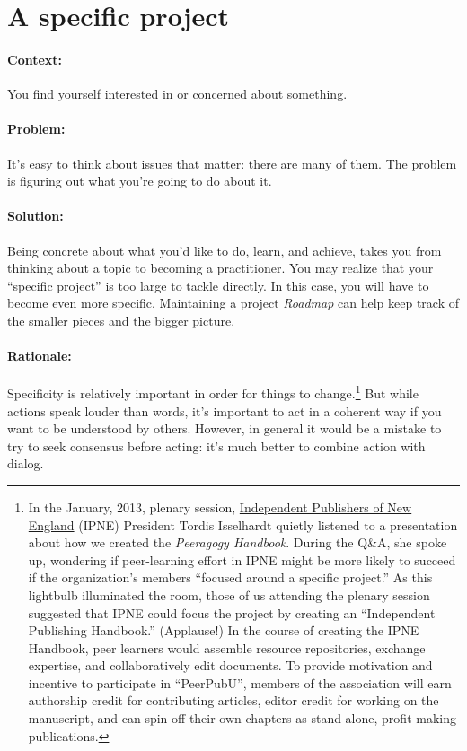 \section{A specific project}
\paragraph{Context:}
You find yourself interested in or concerned about something.

\paragraph{Problem:}
It's easy to think about issues that matter: there are many of them. The problem is figuring out what you're going to do about it.

\paragraph{Solution:} 
Being concrete about what you'd like to do, learn, and achieve, takes you from thinking about a topic to becoming a practitioner.  You may realize that your ``specific project'' is too large to tackle directly. In this case, you will have to become even more specific.  Maintaining a project \emph{Roadmap} can help keep track of the smaller pieces and the bigger picture.

\paragraph{Rationale:} 
Specificity is relatively important in order for things to change.\footnote{In the January, 2013, plenary
session, \href{http://ipne.org}{Independent Publishers of New England}
(IPNE) President Tordis Isselhardt quietly listened to a presentation
about how we created the \emph{Peeragogy Handbook}. During the Q\&A, she
spoke up, wondering if peer-learning effort in IPNE might be more likely
to succeed if the organization's members ``focused around a specific
project.'' As this lightbulb illuminated the room, those of us attending
the plenary session suggested that IPNE could focus the project by
creating an ``Independent Publishing Handbook.'' (Applause!) In the
course of creating the IPNE Handbook, peer learners would assemble
resource repositories, exchange expertise, and collaboratively edit
documents. To provide motivation and incentive to participate in
``PeerPubU'', members of the association will earn authorship credit for
contributing articles, editor credit for working on the manuscript, and
can spin off their own chapters as stand-alone, profit-making
publications.} But while actions speak louder than words, it's important
to act in a coherent way if you want to be understood by others.  However, in
general it would be a mistake to try to seek consensus before acting: it's much better to combine action with dialog.


